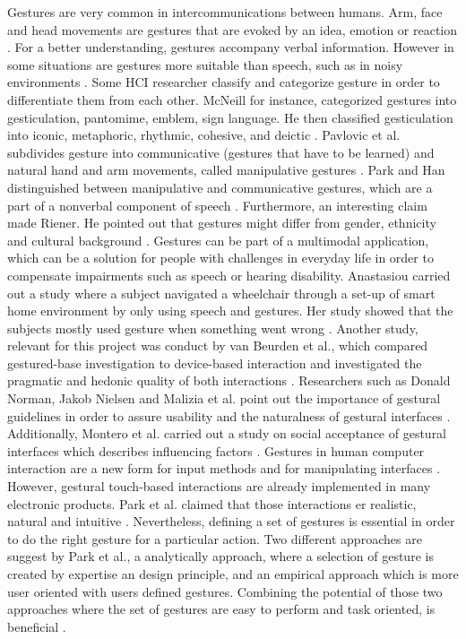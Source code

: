 Gestures are very common in intercommunications between humans. Arm, face and head movements are gestures that are evoked by an idea, emotion or reaction \cite{Grundmann2016}. For a better understanding, gestures accompany verbal information. However in some situations are gestures more suitable than speech, such as in noisy environments \cite{Wagner2014}.
Some HCI researcher classify and categorize gesture in order to differentiate them from each other. McNeill for instance, categorized gestures into gesticulation, pantomime, emblem, sign language. He then classified gesticulation into iconic, metaphoric, rhythmic, cohesive, and deictic \cite{McNeill205}. Pavlovic et al. subdivides gesture into communicative (gestures that have to be learned) and natural hand and arm movements, called manipulative gestures \cite{Pavlovic1997}. Park and Han distinguished between manipulative and communicative gestures, which are a part of a nonverbal component of speech \cite{ParkWonkyu2013}. Furthermore, an interesting claim made Riener. He pointed out that gestures might differ from gender, ethnicity and cultural background \cite{Riener2012}. 
\newline 
Gestures can be part of a multimodal application, which can be a solution for people with challenges in everyday life in order to compensate impairments such as speech or hearing disability. Anastasiou carried out a study where a subject navigated a wheelchair through a set-up of smart home environment by only using speech and gestures. Her study showed that the subjects mostly used gesture when something went wrong \cite{Anastasiou2012}. Another study, relevant for this project was conduct by van Beurden et al., which compared gestured-base investigation to device-based interaction  and investigated the pragmatic and hedonic quality of both interactions \cite{Beurden2012}. Researchers such as Donald Norman, Jakob Nielsen and Malizia et al. point out the importance of gestural guidelines in order to assure usability and the naturalness of gestural interfaces \cite{NormanNielsen2010, Norman2010, Malizia2012}. Additionally, Montero et al. carried out a study on social acceptance of gestural interfaces which describes influencing factors \cite{Montero2010}.
\newline
Gestures in human computer interaction are a new form for input methods and for manipulating interfaces  \cite{Grundmann2016}. However, gestural touch-based interactions are already implemented in many electronic products. Park et al. claimed that those interactions er realistic, natural and intuitive \cite{ParkWonkyu2013}. Nevertheless, defining a set of gestures is essential in order to do the right gesture for a particular action. Two different approaches are suggest by Park et al., a analytically approach, where a selection of gesture is created by expertise an design principle, and an empirical approach which is more user oriented with users defined gestures. Combining the potential of those two approaches where the set of gestures are easy to perform and task oriented, is beneficial \cite{ParkWonkyu2013}. 
